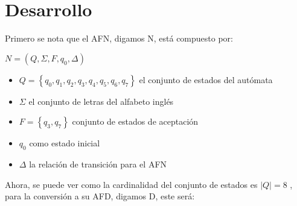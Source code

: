 \documentclass[spanish]{article}
\begin{document}
\section{Desarrollo}
Primero se nota que el AFN, digamos N, está compuesto por:
\begin{center}
$ N = (Q,\Sigma,F,q_{0},\Delta) $
\begin{itemize}
\item{ 
$ Q = \left\{ q_{0},q_{1},q_{2},q_{3},q_{4},q_{5},q_{6},q_{7} \right\} $ el conjunto de estados del autómata
}

\item{
$ \Sigma $ el conjunto de letras del alfabeto inglés 
}

\item{
$ F = \left\{ q_{3},q_{7} \right\} $ conjunto de estados de aceptación
}
\item{
$ q_{0} $ como estado inicial
}
\item{
$ \Delta $ la relación de transición para el AFN
}

\end{itemize}
\end{center}  

Ahora, se puede ver como la cardinalidad del conjunto de estados es $ \vert Q \vert = 8 $ ,
para la conversión a su AFD, digamos D, este será: 
\end{document}
